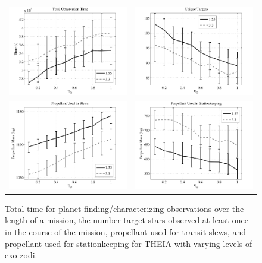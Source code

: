  \begin{figure}[ht]
 \begin{center}
  \begin{tabular}{c c}
   \includegraphics[width=2.9in,clip=true,trim=0.25in 0in 0.5in 0.05in]{./figures/obstime_varZ} &
   \includegraphics[width=2.9in,clip=true,trim=0.25in 0in 0.5in 0.05in]{./figures/utargs_varZ}\\
   \includegraphics[width=2.9in,clip=true,trim=0.1in 0in 0.5in 0.05in]{./figures/slewMass_varZ} &
   \includegraphics[width=2.9in,clip=true,trim=0.1in 0in 0.5in 0.05in]{./figures/skMass_varZ}
   \end{tabular}
 \end{center}
 \caption[Effects of varying exo-zodi levels]{ \label{fig:obstime_varZ} Total time for planet-finding/characterizing observations over the length of a mission, the number  target stars observed at least once in the course of the mission, propellant  used for transit slews, and propellant used for stationkeeping for THEIA with varying levels of exo-zodi.}
 \end{figure}
